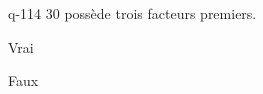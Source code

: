 \begin{truefalse}{q-114}
$30$ possède trois facteurs premiers.
\item* Vrai
\item Faux
\end{truefalse}

